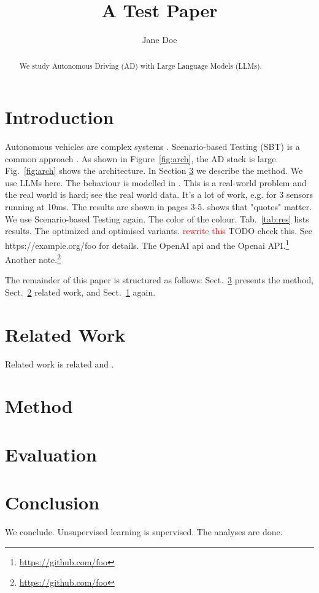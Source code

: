 \documentclass[runningheads,draft]{llncs}
\newcommand{\till}[1]{\textcolor{red}{#1}}
\begin{document}
\title{A Test Paper}
\author{Jane Doe}
\maketitle
\begin{abstract}
We study Autonomous Driving (AD) with Large Language Models (LLMs).
\end{abstract}

\section{Introduction}\label{sec:intro}
Autonomous vehicles are complex systems \cite{smith2020}.
Scenario-based Testing (SBT) is a common approach \cite{doe2021}\cite{smith2020}.
As shown in Figure~\ref{fig:arch}, the AD stack is large.
Fig.~\ref{fig:arch} shows the architecture.
In Section \ref{sec:method} we describe the method.
We use LLMs here. The behaviour is modelled in \cite{doe2021}.
This is a real-world problem and the real world is hard; see the real world data.
It's a lot of work, e.g. for 3 sensors running at 10ms.
The results are shown in pages 3-5.\cite{doe2021}
\cite{smith2020} shows that "quotes" matter.
We use Scenario-based Testing again. The color of the colour.
Tab.~\ref{tab:res} lists results. The optimized and optimised variants.
\till{rewrite this} TODO check this. See https://example.org/foo for details.
The OpenAI api and the Openai API.\footnote{\url{https://github.com/foo}}
Another note.\footnote{\url{https://github.com/foo}}

The remainder of this paper is structured as follows: Sect.~\ref{sec:method} presents the method, Sect.~\ref{sec:related} related work, and Sect.~\ref{sec:intro} again.

\section{Related Work}\label{sec:related}
Related work is related \cite{missingkey} and \cite{}.

\section{Method}\label{sec:method}


\section{Evaluation}\label{sec:eval}

\section{Conclusion}\label{sec:conc}
We conclude. Unsupervised learning is supervised. The analyses are done.



\end{document}
